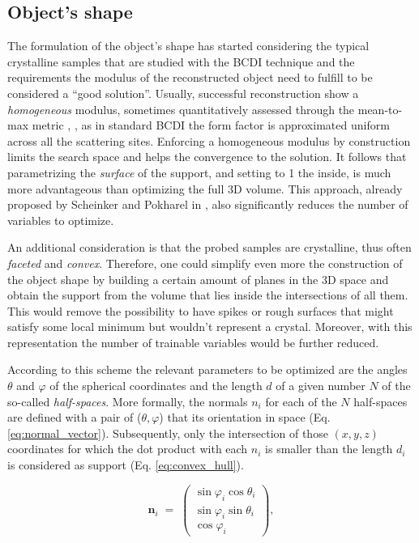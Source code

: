 \subsection{Object's shape}

The formulation of the object's shape has started considering the typical crystalline samples that are studied with the BCDI technique
and the requirements the modulus of the reconstructed object need to fulfill to be considered a ``good solution''. 
Usually, successful reconstruction show a \textit{homogeneous} modulus, sometimes quantitatively assessed through the 
mean-to-max metric \cite{Frisch2023CuAgCatalysts} , \cite{Grimes2024CatalystStrain}, as in standard BCDI the form factor is 
approximated uniform across all the scattering sites. Enforcing a homogeneous modulus by construction limits the search space 
and helps the convergence to the solution. 
It follows that parametrizing the \textit{surface} of the support, and setting to 1 the inside, is much more advantageous than optimizing 
the full 3D volume. This approach, already proposed by Scheinker and Pokharel in \cite{scheinker_adaptive_2020}, 
also significantly reduces the number of variables to optimize.

An additional consideration is that the probed samples are crystalline, thus often \textit{faceted} and \textit{convex}. 
Therefore, one could simplify even more the construction of the object shape by building a certain amount of planes in the 
3D space and obtain the support from the volume that lies inside the intersections of all them. This would remove the possibility 
to have spikes or rough surfaces that might satisfy some local minimum but wouldn't represent a crystal. Moreover, with this 
representation the number of trainable variables would be further reduced. 

According to this scheme the relevant parameters to be optimized are the angles $\theta$ and $ \varphi$ of the spherical 
coordinates and the length $d$ of a given number $N$ of the so-called \textit{half-spaces}. 
More formally, the normals $n_i$ for each of the $N$ half-spaces are defined with a pair of ($\theta , \varphi$) that  its
orientation in space (Eq. \ref{eq:normal_vector}). Subsequently, only the intersection of those $(x,y,z)$ coordinates for which the dot product with 
each $n_i$ is smaller than the length $d_i$ is considered as support (Eq. \ref{eq:convex_hull}).


\begin{equation}
    \mathbf n_i \;=\;
    \begin{pmatrix}
    \sin\varphi_i\cos\theta_i \\[6pt]
    \sin\varphi_i\sin\theta_i \\[6pt]
    \cos\varphi_i
    \end{pmatrix},
    \label{eq:normal_vector}
    \end{equation}
    
